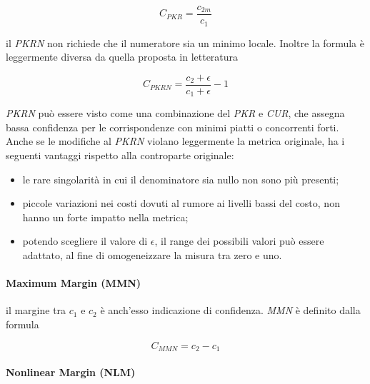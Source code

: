 \documentclass[12pt]{report}
\begin{document}
				\begin{equation}
					C_{PKR}=\frac{c_{2m}}{c_{1}}
					\label{eq:PKR}
				\end{equation}
			
				\noindent il \textit{PKRN} non richiede che il numeratore sia un minimo locale. Inoltre la formula è leggermente diversa da quella proposta in letteratura \cite{mercedes}
			
				\begin{equation}
					C_{PKRN}=\frac{c_{2} + \epsilon}{c_{1} + \epsilon} - 1
					\label{eq:PKRN}
				\end{equation}
		
				\noindent \textit{PKRN} può essere visto come una combinazione del \textit{PKR} e \textit{CUR}, che assegna bassa confidenza per le corrispondenze con minimi piatti o concorrenti forti. Anche se le modifiche al \textit{PKRN} violano leggermente la metrica originale, ha i seguenti vantaggi rispetto alla controparte originale:
				
				\begin{itemize}
					\item le rare singolarità in cui il denominatore sia nullo non sono più presenti;
					\item piccole variazioni nei costi dovuti al rumore ai livelli bassi del costo, non hanno un forte impatto nella metrica; 
					\item potendo scegliere il valore di $\epsilon$, il range dei possibili valori può essere adattato, al fine di omogeneizzare la misura tra zero e uno.
					\label{item:PKRN}			
				\end{itemize}
				
			\paragraph{Maximum Margin (MMN)}
			\label{par:MMN}
			
				il margine tra $c_{1}$ e $c_{2}$ è anch'esso indicazione di confidenza. \textit{MMN} è definito dalla formula
				
				\begin{equation}
					C_{MMN}=c_{2}-c_{1}
					\label{eq:MMN} 
				\end{equation} 	
				
			
			\paragraph{Nonlinear Margin (NLM)}
			\label{par:NLM}
			
\end{document}
